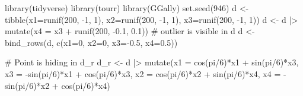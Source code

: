 \documentclass[
  letterpaper,
]{krantz}
\newenvironment{Shaded}{\begin{snugshade}}{\end{snugshade}}
\newcommand{\AttributeTok}[1]{\textcolor[rgb]{0.40,0.45,0.13}{#1}}
\newcommand{\CommentTok}[1]{\textcolor[rgb]{0.37,0.37,0.37}{#1}}
\newcommand{\DecValTok}[1]{\textcolor[rgb]{0.68,0.00,0.00}{#1}}
\newcommand{\FloatTok}[1]{\textcolor[rgb]{0.68,0.00,0.00}{#1}}
\newcommand{\FunctionTok}[1]{\textcolor[rgb]{0.28,0.35,0.67}{#1}}
\newcommand{\NormalTok}[1]{\textcolor[rgb]{0.00,0.23,0.31}{#1}}
\newcommand{\OtherTok}[1]{\textcolor[rgb]{0.00,0.23,0.31}{#1}}
\newcommand{\SpecialCharTok}[1]{\textcolor[rgb]{0.37,0.37,0.37}{#1}}
\begin{document}
\begin{Shaded}
\begin{Highlighting}[]
\FunctionTok{library}\NormalTok{(tidyverse)}
\FunctionTok{library}\NormalTok{(tourr)}
\FunctionTok{library}\NormalTok{(GGally)}
\FunctionTok{set.seed}\NormalTok{(}\DecValTok{946}\NormalTok{)}
\NormalTok{d }\OtherTok{\textless{}{-}} \FunctionTok{tibble}\NormalTok{(}\AttributeTok{x1=}\FunctionTok{runif}\NormalTok{(}\DecValTok{200}\NormalTok{, }\SpecialCharTok{{-}}\DecValTok{1}\NormalTok{, }\DecValTok{1}\NormalTok{), }
            \AttributeTok{x2=}\FunctionTok{runif}\NormalTok{(}\DecValTok{200}\NormalTok{, }\SpecialCharTok{{-}}\DecValTok{1}\NormalTok{, }\DecValTok{1}\NormalTok{), }
            \AttributeTok{x3=}\FunctionTok{runif}\NormalTok{(}\DecValTok{200}\NormalTok{, }\SpecialCharTok{{-}}\DecValTok{1}\NormalTok{, }\DecValTok{1}\NormalTok{))}
\NormalTok{d }\OtherTok{\textless{}{-}}\NormalTok{ d }\SpecialCharTok{|\textgreater{}}
  \FunctionTok{mutate}\NormalTok{(}\AttributeTok{x4 =}\NormalTok{ x3 }\SpecialCharTok{+} \FunctionTok{runif}\NormalTok{(}\DecValTok{200}\NormalTok{, }\SpecialCharTok{{-}}\FloatTok{0.1}\NormalTok{, }\FloatTok{0.1}\NormalTok{))}
\CommentTok{\# outlier is visible in d}
\NormalTok{d }\OtherTok{\textless{}{-}} \FunctionTok{bind\_rows}\NormalTok{(d, }\FunctionTok{c}\NormalTok{(}\AttributeTok{x1=}\DecValTok{0}\NormalTok{, }\AttributeTok{x2=}\DecValTok{0}\NormalTok{, }\AttributeTok{x3=}\SpecialCharTok{{-}}\FloatTok{0.5}\NormalTok{, }\AttributeTok{x4=}\FloatTok{0.5}\NormalTok{))}

\CommentTok{\# Point is hiding in d\_r}
\NormalTok{d\_r }\OtherTok{\textless{}{-}}\NormalTok{ d }\SpecialCharTok{|\textgreater{}}
  \FunctionTok{mutate}\NormalTok{(}\AttributeTok{x1 =} \FunctionTok{cos}\NormalTok{(pi}\SpecialCharTok{/}\DecValTok{6}\NormalTok{)}\SpecialCharTok{*}\NormalTok{x1 }\SpecialCharTok{+} \FunctionTok{sin}\NormalTok{(pi}\SpecialCharTok{/}\DecValTok{6}\NormalTok{)}\SpecialCharTok{*}\NormalTok{x3,}
         \AttributeTok{x3 =} \SpecialCharTok{{-}}\FunctionTok{sin}\NormalTok{(pi}\SpecialCharTok{/}\DecValTok{6}\NormalTok{)}\SpecialCharTok{*}\NormalTok{x1 }\SpecialCharTok{+} \FunctionTok{cos}\NormalTok{(pi}\SpecialCharTok{/}\DecValTok{6}\NormalTok{)}\SpecialCharTok{*}\NormalTok{x3,}
         \AttributeTok{x2 =} \FunctionTok{cos}\NormalTok{(pi}\SpecialCharTok{/}\DecValTok{6}\NormalTok{)}\SpecialCharTok{*}\NormalTok{x2 }\SpecialCharTok{+} \FunctionTok{sin}\NormalTok{(pi}\SpecialCharTok{/}\DecValTok{6}\NormalTok{)}\SpecialCharTok{*}\NormalTok{x4,}
         \AttributeTok{x4 =} \SpecialCharTok{{-}}\FunctionTok{sin}\NormalTok{(pi}\SpecialCharTok{/}\DecValTok{6}\NormalTok{)}\SpecialCharTok{*}\NormalTok{x2 }\SpecialCharTok{+} \FunctionTok{cos}\NormalTok{(pi}\SpecialCharTok{/}\DecValTok{6}\NormalTok{)}\SpecialCharTok{*}\NormalTok{x4)}
\end{Highlighting}
\end{Shaded}
\end{document}
